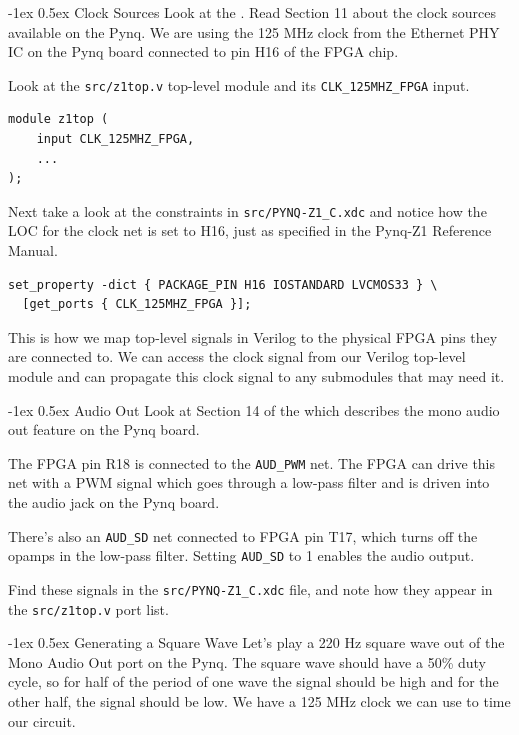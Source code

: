\documentclass[11pt]{article}
\makeatletter
\renewcommand{\subsection}
{\@startsection {subsection}{1}{0pt}
 {-1ex}
 {0.5ex}
 {\bfseries\normalsize}}
\makeatother
\begin{document}
\subsection{Clock Sources}
Look at the \href{https://reference.digilentinc.com/reference/programmable-logic/pynq-z1/reference-manual}{\color{blue}{Pynq Reference Manual}}.
Read Section 11 about the clock sources available on the Pynq.
We are using the 125 MHz clock from the Ethernet PHY IC on the Pynq board connected to pin H16 of the FPGA chip.

Look at the \texttt{src/z1top.v} top-level module and its \verb|CLK_125MHZ_FPGA| input.
\begin{verbatim}
module z1top (
    input CLK_125MHZ_FPGA,
    ...
);
\end{verbatim}
Next take a look at the constraints in \texttt{src/PYNQ-Z1\_C.xdc} and notice how the LOC for the clock net is set to H16, just as specified in the Pynq-Z1 Reference Manual.
\begin{verbatim}
set_property -dict { PACKAGE_PIN H16 IOSTANDARD LVCMOS33 } \
  [get_ports { CLK_125MHZ_FPGA }];
\end{verbatim}
This is how we map top-level signals in Verilog to the physical FPGA pins they are connected to.
We can access the clock signal from our Verilog top-level module and can propagate this clock signal to any submodules that may need it.

\subsection{Audio Out}
Look at Section 14 of the \href{https://reference.digilentinc.com/reference/programmable-logic/pynq-z1/reference-manual}{\color{blue}{Pynq Reference Manual}} which describes the mono audio out feature on the Pynq board.

The FPGA pin R18 is connected to the \verb|AUD_PWM| net.
The FPGA can drive this net with a PWM signal which goes through a low-pass filter and is driven into the audio jack on the Pynq board.

There's also an \verb|AUD_SD| net connected to FPGA pin T17, which turns off the opamps in the low-pass filter.
Setting \verb|AUD_SD| to 1 enables the audio output.

Find these signals in the \texttt{src/PYNQ-Z1\_C.xdc} file, and note how they appear in the \texttt{src/z1top.v} port list.

\subsection{Generating a Square Wave}
Let's play a 220 Hz square wave out of the Mono Audio Out port on the Pynq.
The square wave should have a 50\% duty cycle, so for half of the period of one wave the signal should be high and for the other half, the signal should be low.
We have a 125 MHz clock we can use to time our circuit.
\end{document}

